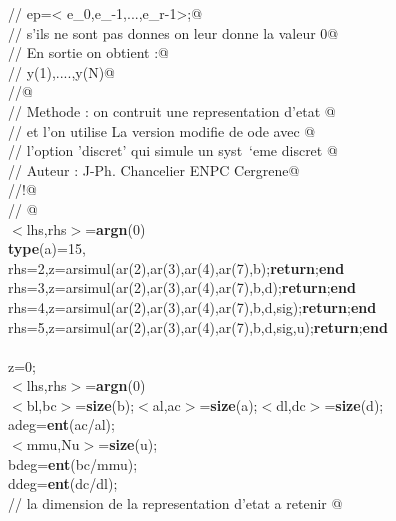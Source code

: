 {\begin{flushleft}
{\cmarg \verb@//      ep=< e\_0,e\_{-1},...,e\_{r-1}>;@\\ 
\cmarg \verb@//      s'ils ne sont pas donnes on leur donne la valeur 0@\\ 
\cmarg \verb@// En sortie on obtient :@\\ 
\cmarg \verb@//      y(1),....,y(N)@\\ 
\cmarg \verb@//@\\ 
\cmarg \verb@// Methode : on contruit une representation d'etat  @\\ 
\cmarg \verb@// et l'on utilise La version modifie de ode avec @\\ 
\cmarg \verb@// l'option 'discret' qui simule un syst\ `eme discret @\\ 
\cmarg \verb@// Auteur : J-Ph. Chancelier ENPC Cergrene@\\ 
\cmarg \verb@//!@\\ 
\cmarg \verb@// @\\ 
\cmarg $<$lhs,rhs$>$={\bf argn}(0)\\ 
 {\bf type}(a)=15,\\ 
\cmarg \hspace{0.8cm}{\bf if} rhs=2,z=arsimul(ar(2),ar(3),ar(4),ar(7),b);{\bf return};{\bf end}\\ 
\cmarg \hspace{0.8cm}{\bf if} rhs=3,z=arsimul(ar(2),ar(3),ar(4),ar(7),b,d);{\bf return};{\bf end}\\ 
\cmarg \hspace{0.8cm}{\bf if} rhs=4,z=arsimul(ar(2),ar(3),ar(4),ar(7),b,d,sig);{\bf return};{\bf end}\\ 
\cmarg \hspace{0.8cm}{\bf if} rhs=5,z=arsimul(ar(2),ar(3),ar(4),ar(7),b,d,sig,u);{\bf return};{\bf end}\\ 
 \\ 
\cmarg z=0;\\ 
\cmarg $<$lhs,rhs$>$={\bf argn}(0)\\ 
\cmarg $<$bl,bc$>$={\bf size}(b);$<$al,ac$>$={\bf size}(a);$<$dl,dc$>$={\bf size}(d);\\ 
\cmarg adeg={\bf ent}(ac/al);\\ 
\cmarg $<$mmu,Nu$>$={\bf size}(u);\\ 
\cmarg bdeg={\bf ent}(bc/mmu);\\ 
\cmarg ddeg={\bf ent}(dc/dl);\\ 
\cmarg \verb@// la dimension de la representation d'etat a retenir @\\ 
}
\end{flushleft}}

